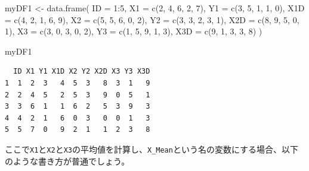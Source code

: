 \documentclass[
  a4paper,
  pandoc,
  ja=standard,
  jafont=haranoaji]{bxjsbook}
\newenvironment{Shaded}{\begin{snugshade}}{\end{snugshade}}
\newcommand{\AttributeTok}[1]{\textcolor[rgb]{0.00,0.48,0.65}{#1}}
\newcommand{\DecValTok}[1]{\textcolor[rgb]{0.68,0.00,0.00}{#1}}
\newcommand{\FunctionTok}[1]{\textcolor[rgb]{0.28,0.35,0.67}{#1}}
\newcommand{\NormalTok}[1]{\textcolor[rgb]{0.00,0.48,0.65}{#1}}
\newcommand{\OtherTok}[1]{\textcolor[rgb]{0.00,0.48,0.65}{#1}}
\newcommand{\SpecialCharTok}[1]{\textcolor[rgb]{0.37,0.37,0.37}{#1}}
\begin{document}
\begin{Shaded}
\begin{Highlighting}[numbers=left,,]
\NormalTok{myDF1 }\OtherTok{\textless{}{-}} \FunctionTok{data.frame}\NormalTok{(}
  \AttributeTok{ID  =} \DecValTok{1}\SpecialCharTok{:}\DecValTok{5}\NormalTok{,}
  \AttributeTok{X1  =} \FunctionTok{c}\NormalTok{(}\DecValTok{2}\NormalTok{, }\DecValTok{4}\NormalTok{, }\DecValTok{6}\NormalTok{, }\DecValTok{2}\NormalTok{, }\DecValTok{7}\NormalTok{),}
  \AttributeTok{Y1  =} \FunctionTok{c}\NormalTok{(}\DecValTok{3}\NormalTok{, }\DecValTok{5}\NormalTok{, }\DecValTok{1}\NormalTok{, }\DecValTok{1}\NormalTok{, }\DecValTok{0}\NormalTok{),}
  \AttributeTok{X1D =} \FunctionTok{c}\NormalTok{(}\DecValTok{4}\NormalTok{, }\DecValTok{2}\NormalTok{, }\DecValTok{1}\NormalTok{, }\DecValTok{6}\NormalTok{, }\DecValTok{9}\NormalTok{),}
  \AttributeTok{X2  =} \FunctionTok{c}\NormalTok{(}\DecValTok{5}\NormalTok{, }\DecValTok{5}\NormalTok{, }\DecValTok{6}\NormalTok{, }\DecValTok{0}\NormalTok{, }\DecValTok{2}\NormalTok{),}
  \AttributeTok{Y2  =} \FunctionTok{c}\NormalTok{(}\DecValTok{3}\NormalTok{, }\DecValTok{3}\NormalTok{, }\DecValTok{2}\NormalTok{, }\DecValTok{3}\NormalTok{, }\DecValTok{1}\NormalTok{),}
  \AttributeTok{X2D =} \FunctionTok{c}\NormalTok{(}\DecValTok{8}\NormalTok{, }\DecValTok{9}\NormalTok{, }\DecValTok{5}\NormalTok{, }\DecValTok{0}\NormalTok{, }\DecValTok{1}\NormalTok{),}
  \AttributeTok{X3  =} \FunctionTok{c}\NormalTok{(}\DecValTok{3}\NormalTok{, }\DecValTok{0}\NormalTok{, }\DecValTok{3}\NormalTok{, }\DecValTok{0}\NormalTok{, }\DecValTok{2}\NormalTok{),}
  \AttributeTok{Y3  =} \FunctionTok{c}\NormalTok{(}\DecValTok{1}\NormalTok{, }\DecValTok{5}\NormalTok{, }\DecValTok{9}\NormalTok{, }\DecValTok{1}\NormalTok{, }\DecValTok{3}\NormalTok{),}
  \AttributeTok{X3D =} \FunctionTok{c}\NormalTok{(}\DecValTok{9}\NormalTok{, }\DecValTok{1}\NormalTok{, }\DecValTok{3}\NormalTok{, }\DecValTok{3}\NormalTok{, }\DecValTok{8}\NormalTok{)}
\NormalTok{)}

\NormalTok{myDF1}
\end{Highlighting}
\end{Shaded}

\begin{verbatim}
  ID X1 Y1 X1D X2 Y2 X2D X3 Y3 X3D
1  1  2  3   4  5  3   8  3  1   9
2  2  4  5   2  5  3   9  0  5   1
3  3  6  1   1  6  2   5  3  9   3
4  4  2  1   6  0  3   0  0  1   3
5  5  7  0   9  2  1   1  2  3   8
\end{verbatim}

ここで\texttt{X1}と\texttt{X2}と\texttt{X3}の平均値を計算し、\texttt{X\_Mean}という名の変数にする場合、以下のような書き方が普通でしょう。
\end{document}
